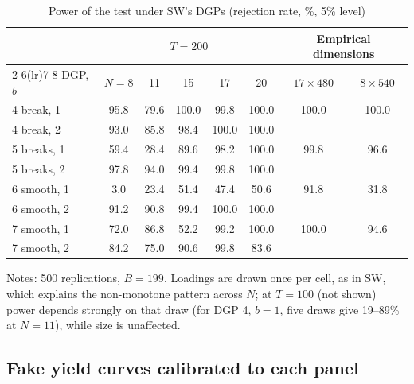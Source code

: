 \documentclass[11pt]{article}
\begin{document}
\begin{table}[htbp]
\centering
\begin{threeparttable}
\caption{Power of the test under SW's DGPs (rejection rate, \%, 5\% level)}\label{tab.swpower}
\begin{tabular}{lccccccc}
\toprule
 & \multicolumn{5}{c}{$T=200$} & \multicolumn{2}{c}{Empirical dimensions}\\
\cmidrule(lr){2-6}\cmidrule(lr){7-8}
DGP, $b$ & $N=8$ & 11 & 15 & 17 & 20 & $17\times480$ & $8\times540$\\
\midrule
4 break, 1 & 95.8 & 79.6 & 100.0 & 99.8 & 100.0 & 100.0 & 100.0\\
4 break, 2 & 93.0 & 85.8 & 98.4 & 100.0 & 100.0 & & \\
5 breaks, 1 & 59.4 & 28.4 & 89.6 & 98.2 & 100.0 & 99.8 & 96.6\\
5 breaks, 2 & 97.8 & 94.0 & 99.4 & 99.8 & 100.0 & & \\
6 smooth, 1 & 3.0 & 23.4 & 51.4 & 47.4 & 50.6 & 91.8 & 31.8\\
6 smooth, 2 & 91.2 & 90.8 & 99.4 & 100.0 & 100.0 & & \\
7 smooth, 1 & 72.0 & 86.8 & 52.2 & 99.2 & 100.0 & 100.0 & 94.6\\
7 smooth, 2 & 84.2 & 75.0 & 90.6 & 99.8 & 83.6 & & \\
\bottomrule
\end{tabular}
\begin{tablenotes}\small
\item Notes: 500 replications, $B=199$. Loadings are drawn once per cell, as in SW, which explains the non-monotone pattern across $N$; at $T=100$ (not shown) power depends strongly on that draw (for DGP 4, $b=1$, five draws give 19--89\% at $N=11$), while size is unaffected.
\end{tablenotes}
\end{threeparttable}
\end{table}

\subsection{Fake yield curves calibrated to each panel}
\end{document}
